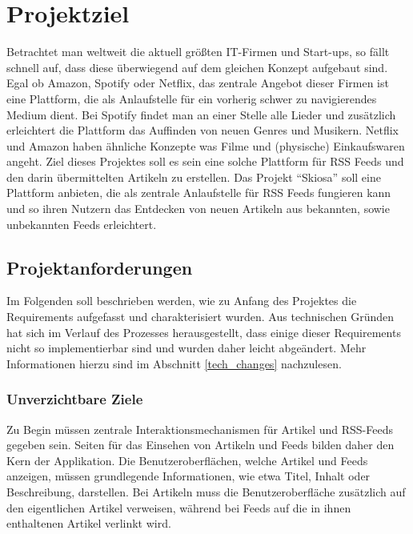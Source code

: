 
\chapter{Projektziel}

Betrachtet man weltweit die aktuell größten IT-Firmen und Start-ups, so fällt schnell auf, dass diese überwiegend auf dem gleichen Konzept aufgebaut sind.
Egal ob Amazon, Spotify oder Netflix, das zentrale Angebot dieser Firmen ist eine Plattform, die als Anlaufstelle für ein vorherig schwer zu navigierendes Medium dient.
Bei Spotify findet man an einer Stelle alle Lieder und zusätzlich erleichtert die Plattform das Auffinden von neuen Genres und Musikern.
Netflix und Amazon haben ähnliche Konzepte was Filme und (physische) Einkaufswaren angeht.
Ziel dieses Projektes soll es sein eine solche Plattform für RSS Feeds und den darin übermittelten Artikeln zu erstellen.
Das Projekt \enquote{Skiosa} soll eine Plattform anbieten, die als zentrale Anlaufstelle für RSS Feeds fungieren kann und so ihren Nutzern das Entdecken von neuen Artikeln aus bekannten, sowie unbekannten Feeds erleichtert.

\section{Projektanforderungen}

Im Folgenden soll beschrieben werden, wie zu Anfang des Projektes die Requirements aufgefasst und charakterisiert wurden.
Aus technischen Gründen hat sich im Verlauf des Prozesses herausgestellt, dass einige dieser Requirements nicht so implementierbar sind und wurden daher leicht abgeändert.
Mehr Informationen hierzu sind im Abschnitt \ref{tech_changes} nachzulesen.

\subsection{Unverzichtbare Ziele}
Zu Begin müssen zentrale Interaktionsmechanismen für Artikel und RSS-Feeds gegeben sein.
Seiten für das Einsehen von Artikeln und Feeds bilden daher den Kern der Applikation.
Die Benutzeroberflächen, welche Artikel und Feeds anzeigen, müssen grundlegende Informationen, wie etwa Titel, Inhalt oder Beschreibung, darstellen.
Bei Artikeln muss die Benutzeroberfläche zusätzlich auf den eigentlichen Artikel verweisen, während bei Feeds auf die in ihnen enthaltenen Artikel verlinkt wird.

